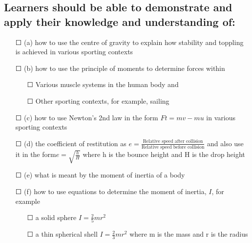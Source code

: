 \subsection*{Learners should be able to demonstrate and apply their knowledge and
	understanding of:}
\begin{itemize}
	\item[\Large{$\Square$}] (a) how to use the centre of gravity to explain how stability and toppling is
	achieved in various sporting contexts
	\item[\Large{$\Square$}] (b) how to use the principle of moments to determine forces within
	\begin{itemize}
		\item[\Large{$\Square$}] Various muscle systems in the human body and
		\item[\Large{$\Square$}] Other sporting contexts, for example, sailing
	\end{itemize}
	\item[\Large{$\Square$}] (c) how to use Newton’s 2nd law in the form \(Ft=mv-mu\) in various sporting
	contexts
	\item[\Large{$\Square$}] (d) the coefficient of restitution as \(e = \frac{\text{Relative speed after collision}}{\text{Relative speed before collision}}\) and also use it in the form\( e= \sqrt{\frac{h}{H}}\) where h is the bounce height and H is the drop height
	\item[\Large{$\Square$}] (e) what is meant by the moment of inertia of a body
	\item[\Large{$\Square$}] (f) how to use equations to determine the moment of inertia, \(I\), for example
	\begin{itemize}
		
		\item[\Large{$\Square$}]a solid sphere \( I= \frac{2}{5}mr^{2} \)
		\item[\Large{$\Square$}]a thin spherical shell \( I=\frac{2}{3}mr^{2} \) where m is the mass and r is the radius
		

\end{itemize}
\end{itemize}

